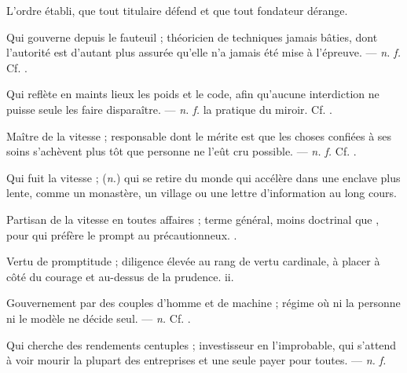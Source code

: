   L'ordre établi, que tout titulaire défend et que tout fondateur dérange.

 Qui gouverne depuis le fauteuil ; théoricien de techniques jamais bâties, dont l'autorité est d'autant plus assurée qu'elle n'a jamais été mise à l'épreuve. ---  \textit{n. f.} Cf. .

 Qui reflète en maints lieux les poids et le code, afin qu'aucune interdiction ne puisse seule les faire disparaître. ---  \textit{n. f.} la pratique du miroir. Cf. .

 Maître de la vitesse ; responsable dont le mérite est que les choses confiées à ses soins s'achèvent plus tôt que personne ne l'eût cru possible. ---  \textit{n. f.} Cf. .

 Qui fuit la vitesse ; (\textit{n.}) qui se retire du monde qui accélère dans une enclave plus lente, comme un monastère, un village ou une lettre d'information au long cours.

 Partisan de la vitesse en toutes affaires ; terme général, moins doctrinal que , pour qui préfère le prompt au précautionneux. .

 Vertu de promptitude ; diligence élevée au rang de vertu cardinale, à placer à côté du courage et au-dessus de la prudence.   ii.

 Gouvernement par des couples d'homme et de machine ; régime où ni la personne ni le modèle ne décide seul. ---  \textit{n.} Cf. .

 Qui cherche des rendements centuples ; investisseur en l'improbable, qui s'attend à voir mourir la plupart des entreprises et une seule payer pour toutes. ---  \textit{n. f.}

